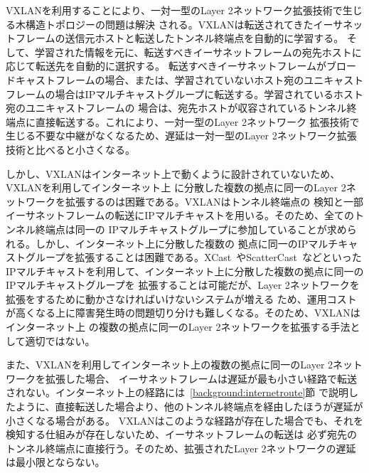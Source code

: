 VXLANを利用することにより、一対一型のLayer 2ネットワーク拡張技術で生じる木構造トポロジーの問題は解決
される。VXLANは転送されてきたイーサネットフレームの送信元ホストと転送したトンネル終端点を自動的に学習する。
そして、学習された情報を元に、転送すべきイーサネットフレームの宛先ホストに応じて転送先を自動的に選択する。
転送すべきイーサネットフレームがブロードキャストフレームの場合、または、学習されていないホスト宛のユニキャスト
フレームの場合はIPマルチキャストグループに転送する。学習されているホスト宛のユニキャストフレームの
場合は、宛先ホストが収容されているトンネル終端点に直接転送する。これにより、一対一型のLayer 2ネットワーク
拡張技術で生じる不要な中継がなくなるため、遅延は一対一型のLayer 2ネットワーク拡張技術と比べると小さくなる。

しかし、VXLANはインターネット上で動くように設計されていないため、VXLANを利用してインターネット上
に分散した複数の拠点に同一のLayer 2ネットワークを拡張するのは困難である。VXLANはトンネル終端点の
検知と一部イーサネットフレームの転送にIPマルチキャストを用いる。そのため、全てのトンネル終端点は同一の
IPマルチキャストグループに参加していることが求められる。しかし、インターネット上に分散した複数の
拠点に同一のIPマルチキャストグループを拡張することは困難である。XCast~\cite{rfc:xcast}やScatterCast~\cite{scattercast}などといった
IPマルチキャストを利用して、インターネット上に分散した複数の拠点に同一のIPマルチキャストグループを
拡張することは可能だが、Layer 2ネットワークを拡張をするために動かさなければいけないシステムが増える
ため、運用コストが高くなる上に障害発生時の問題切り分けも難しくなる。そのため、VXLANはインターネット上
の複数の拠点に同一のLayer 2ネットワークを拡張する手法として適切ではない。

また、VXLANを利用してインターネット上の複数の拠点に同一のLayer 2ネットワークを拡張した場合、
イーサネットフレームは遅延が最も小さい経路で転送されない。インターネット上の経路には~\ref{background:internetroute}節
で説明したように、直接転送した場合より、他のトンネル終端点を経由したほうが遅延が小さくなる場合がある。
VXLANはこのような経路が存在した場合でも、それを検知する仕組みが存在しないため、イーサネットフレームの転送は
必ず宛先のトンネル終端点に直接行う。そのため、拡張されたLayer 2ネットワークの遅延は最小限とならない。

